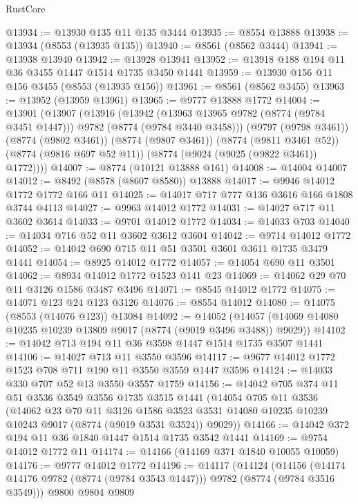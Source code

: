 \begin{lexlean}{RustCore}
\begin{coremodule}
@13934 := @13930 @135 @11 @135 @3444
@13935 := @8554 @13888
@13938 := @13934 (@8553 (@13935 @135))
@13940 := @8561 (@8562 @3444)
@13941 := @13938 @13940
@13942 := @13928 @13941
@13952 := @13918 @188 @194 @11 @36 @3455 @1447 @1514 @1735 @3450 @1441
@13959 := @13930 @156 @11 @156 @3455 (@8553 (@13935 @156))
@13961 := @8561 (@8562 @3455)
@13963 := @13952 (@13959 @13961)
@13965 := @9777 @13888 @1772
@14004 := @13901
    (@13907
      (@13916
        (@13942 (@13963 @13965 @9782 (@8774 (@9784 @3451 @1447))) @9782 (@8774 (@9784 @3440 @3458)))
        (@9797 (@9798 @3461))
        (@8774 (@9802 @3461))
        (@8774 (@9807 @3461))
        (@8774 (@9811 @3461 @52))
        (@8774 (@9816 @697 @52 @11))
        (@8774 (@9024 (@9025 (@9822 @3461)) @1772))))
@14007 := @8774 (@10121 @13888 @161)
@14008 := @14004 @14007
@14012 := @8492 (@8578 (@8607 @8580)) @13888
@14017 := @9946 @14012 @1772 @1772 @166 @11
@14025 := @14017 @717 @777 @136 @3616 @166 @1808 @3744 @4113
@14027 := @9963 @14012 @1772
@14031 := @14027 @717 @11 @3602 @3614
@14033 := @9701 @14012 @1772
@14034 := @14033 @703
@14040 := @14034 @716 @52 @11 @3602 @3612 @3604
@14042 := @9714 @14012 @1772
@14052 := @14042 @690 @715 @11 @51 @3501 @3601 @3611 @1735 @3479 @1441
@14054 := @8925 @14012 @1772
@14057 := @14054 @690 @11 @3501
@14062 := @8934 @14012 @1772 @1523 @141 @23
@14069 := @14062 @29 @70 @11 @3126 @1586 @3487 @3496
@14071 := @8545 @14012 @1772
@14075 := @14071 @123 @24 @123 @3126
@14076 := @8554 @14012
@14080 := @14075 (@8553 (@14076 @123)) @13084
@14092 := @14052
    (@14057 (@14069 @14080 @10235 @10239 @13809 @9017 (@8774 (@9019 @3496 @3488)) @9029))
@14102 := @14042 @713 @194 @11 @36 @3598 @1447 @1514 @1735 @3507 @1441
@14106 := @14027 @713 @11 @3550 @3596
@14117 := @9677 @14012 @1772 @1523 @708 @711 @190 @11 @3550 @3559 @1447 @3596
@14124 := @14033 @330 @707 @52 @13 @3550 @3557 @1759
@14156 := @14042
    @705
    @374
    @11
    @51
    @3536
    @3549
    @3556
    @1735
    @3515
    @1441
    (@14054
      @705
      @11
      @3536
      (@14062
        @23
        @70
        @11
        @3126
        @1586
        @3523
        @3531
        @14080
        @10235
        @10239
        @10243
        @9017
        (@8774 (@9019 @3531 @3524))
        @9029))
@14166 := @14042 @372 @194 @11 @36 @1840 @1447 @1514 @1735 @3542 @1441
@14169 := @9754 @14012 @1772 @11
@14174 := @14166 (@14169 @371 @1840 @10055 @10059)
@14176 := @9777 @14012 @1772
@14196 := @14117
    (@14124
      (@14156 (@14174 @14176 @9782 (@8774 (@9784 @3543 @1447))) @9782 (@8774 (@9784 @3516 @3549)))
      @9800
      @9804
      @9809

\end{coremodule}
\end{lexlean}
